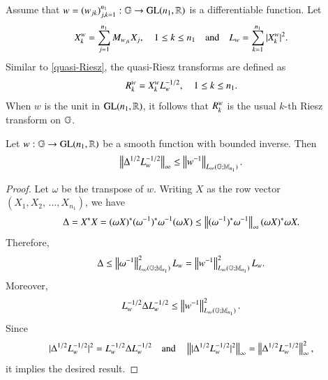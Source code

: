 \documentclass[leqno]{amsart}
\begin{document}
	
	
	\begin{definition}\label{vqr}
		Assume that $w=(w_{jk})_{j,k=1}^{n_{1}}:\mathbb{G}\rightarrow{\rm GL}(n_{1},\mathbb{R})$ is a differentiable function. Let
		\begin{align*}
			X_{k}^{w}=\sum_{j=1}^{n_{1}}M_{w_{jk}}X_{j},\quad1\leq k\leq n_{1}\quad{\rm and}\quad L_{w}=\sum_{k=1}^{n_{1}}|X_{k}^{w}|^{2}.
		\end{align*}
		Similar to \eqref{quasi-Riesz}, the quasi-Riesz transforms are defined as
		\begin{align*}
			{ R}^{w}_{k}=X_{k}^{w}L_{w}^{-1/2},\quad1\leq k\leq n_{1}.
		\end{align*}
		When $w$ is the unit in ${\rm GL}(n_{1},\mathbb{R})$, it follows that ${ R}^{w}_{k}$ is the usual $k$-th Riesz transform on $\mathbb{G}$.
	\end{definition}
	
	
	
	\begin{lemma}\label{laplacinbd}
		Let $w:\mathbb{G}\rightarrow{\rm GL}(n_{1},\mathbb{R})$ be a smooth function with bounded inverse. Then
		$$\left\| \Delta^{1/2}L_{w}^{-1/2} \right\|_{\infty}\leq\left\| w^{-1} \right\|_{L_{\infty}(\mathbb{G};\mathbb{M}_{n_{1}})}.$$
	\end{lemma}
	
	\begin{proof}
		
		Let $\omega$ be the transpose of $w$. Writing $X$ as the row vector $(X_{1},X_{2},\,\dotsc,X_{n_{1}})$, we have
		\begin{align*}
			\Delta=X^{*}X
			=(\omega X)^{*} (\omega^{-1})^{*}\omega^{-1} (\omega X)\leq\left\| (\omega^{-1})^{*}\omega^{-1} \right\|_{\infty}(\omega X)^{*}\omega X.
		\end{align*}
		Therefore,
		\begin{align*}
			\Delta\leq\left\| \omega^{-1} \right\|_{L_{\infty}(\mathbb{G};\mathbb{M}_{n_{1}})}^{2}L_{w}=\left\| w^{-1} \right\|_{L_{\infty}(\mathbb{G};\mathbb{M}_{n_{1}})}^{2}L_{w}.
		\end{align*}
		Moreover,
		\begin{align*}
			L_{w}^{-1/2}\Delta L_{w}^{-1/2}\leq\left\| w^{-1} \right\|_{L_{\infty}(\mathbb{G};\mathbb{M}_{n_{1}})}^{2}.
		\end{align*}
		Since 
		\begin{align*}
			|\Delta^{1/2}L_{w}^{-1/2}|^{2}=L_{w}^{-1/2}\Delta L_{w}^{-1/2}
			\quad\mbox{and}\quad 
			\left\| |\Delta^{1/2}L_{w}^{-1/2}|^{2} \right\|_{\infty}
			=\left\| \Delta^{1/2}L_{w}^{-1/2} \right\|_{\infty}^{2},
		\end{align*}
		it implies the desired result.
	\end{proof}
	
\end{document}
